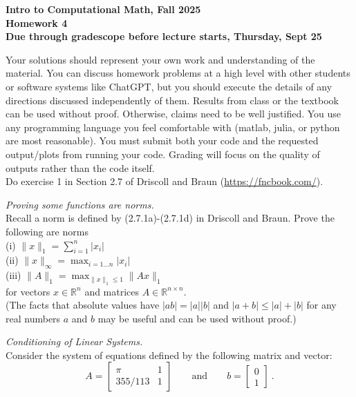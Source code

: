 \documentclass[11pt]{article}
\begin{document}
\begin{center}
{\bf Intro to Computational Math, Fall 2025\\
Homework 4\\
Due through gradescope before lecture starts, Thursday, Sept 25}
\end{center}

Your solutions should represent your own work and understanding of the material. You can discuss homework problems at a high level with other students or software systems like ChatGPT, but you should execute the details of any directions discussed independently of them. Results from class or the textbook can be used without proof. Otherwise, claims need to be well justified. You use any programming language you feel comfortable with (matlab, julia, or python are most reasonable). You must submit both your code and the requested output/plots from running your code. Grading will focus on the quality of outputs rather than the code itself.\\

 Do exercise 1 in Section 2.7 of Driscoll and Braun (\url{https://fncbook.com/}).

\vskip1cm


 {\it Proving some functions are norms.}\\
Recall a norm is defined by (2.7.1a)-(2.7.1d) in Driscoll and Braun. Prove the following are norms\\
(i) $\|x\|_1 = \sum_{i=1}^n|x_i|$\\
(ii) $\|x\|_\infty = \max_{i=1\dots n} |x_i|$\\
(iii) $\|A\|_{1} = \max_{\|x\|_1\leq 1} \|Ax\|_1$\\
for vectors $x\in\mathbb{R}^n$ and matrices $A\in\mathbb{R}^{n\times n}$.\\
(The facts that absolute values have $|ab| = |a||b|$ and $|a+b|\leq |a|+|b|$ for any real numbers $a$ and $b$ may be useful and can be used without proof.)\\


\vskip0.5cm

 {\it Conditioning of Linear Systems.}\\
    Consider the system of equations defined by the following matrix and vector:
    $$ A = \begin{bmatrix}
        \pi & 1 \\
        355/113 & 1
    \end{bmatrix} \qquad \text{and} \qquad b=\begin{bmatrix} 0  \\ 1 \end{bmatrix} \ .
    $$ 
    
\end{document}
